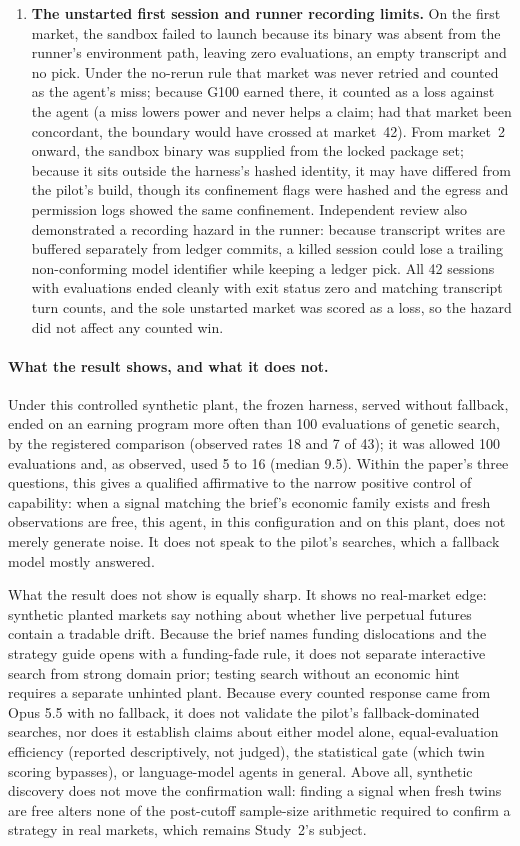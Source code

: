 \documentclass[11pt]{article}
\begin{document}
\begin{enumerate}
  \item \textbf{The unstarted first session and runner recording limits.} On the first market, the sandbox failed to launch because its binary was absent from the runner's environment path, leaving zero evaluations, an empty transcript and no pick. Under the no-rerun rule that market was never retried and counted as the agent's miss; because G100 earned there, it counted as a loss against the agent (a miss lowers power and never helps a claim; had that market been concordant, the boundary would have crossed at market~42). From market~2 onward, the sandbox binary was supplied from the locked package set; because it sits outside the harness's hashed identity, it may have differed from the pilot's build, though its confinement flags were hashed and the egress and permission logs showed the same confinement. Independent review also demonstrated a recording hazard in the runner: because transcript writes are buffered separately from ledger commits, a killed session could lose a trailing non-conforming model identifier while keeping a ledger pick. All 42 sessions with evaluations ended cleanly with exit status zero and matching transcript turn counts, and the sole unstarted market was scored as a loss, so the hazard did not affect any counted win.
\end{enumerate}

\paragraph{What the result shows, and what it does not.} Under this controlled synthetic plant, the frozen harness, served without fallback, ended on an earning program more often than 100 evaluations of genetic search, by the registered comparison (observed rates 18 and 7 of 43); it was allowed 100 evaluations and, as observed, used 5 to 16 (median 9.5). Within the paper's three questions, this gives a qualified affirmative to the narrow positive control of capability: when a signal matching the brief's economic family exists and fresh observations are free, this agent, in this configuration and on this plant, does not merely generate noise. It does not speak to the pilot's searches, which a fallback model mostly answered.

What the result does not show is equally sharp. It shows no real-market edge: synthetic planted markets say nothing about whether live perpetual futures contain a tradable drift. Because the brief names funding dislocations and the strategy guide opens with a funding-fade rule, it does not separate interactive search from strong domain prior; testing search without an economic hint requires a separate unhinted plant. Because every counted response came from Opus 5.5 with no fallback, it does not validate the pilot's fallback-dominated searches, nor does it establish claims about either model alone, equal-evaluation efficiency (reported descriptively, not judged), the statistical gate (which twin scoring bypasses), or language-model agents in general. Above all, synthetic discovery does not move the confirmation wall: finding a signal when fresh twins are free alters none of the post-cutoff sample-size arithmetic required to confirm a strategy in real markets, which remains Study~2's subject.
\end{document}
